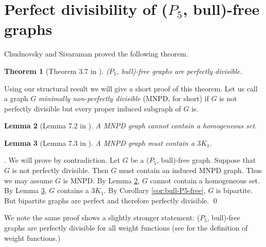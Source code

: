 \documentclass[a4paper,11pt]{article}
\newtheorem{theorem}{Theorem}[section]
\newtheorem{lemma}[theorem]{Lemma}
\theoremstyle{case}
\begin{document}
\section{Perfect divisibility of ($P_5$, bull)-free graphs}\label{sec:divisibility}
Chudnovsky and Sivaraman \cite{ChuSiv2019} proved the following theorem. 
\begin{theorem}[Theorem 3.7 in \cite{ChuSiv2019}]\label{thm:perfectlydivisible} 
($P_5$, bull)-free graphs are perfectly divisible. 
\end{theorem}
Using our structural result we will give a short proof of this theorem. Let us call a graph $G$ {\it minimally non-perfectly divisible} (MNPD, for short) if $G$ is not perfectly divisible but every proper induced subgraph of $G$ is. 
\begin{lemma}[Lemma 7.2 in \cite{Hoa2018}]\label{lem:homogeneous}
    A MNPD graph cannot contain a homogeneous set.
\end{lemma}
\begin{lemma}[Lemma 7.3 in \cite{Hoa2018}]\label{lem:3K1}
    A MNPD graph must contain a $3K_1$.
\end{lemma}
. We will prove by contradiction. 
Let $G$ be a ($P_5$, bull)-free graph. Suppose that $G$ is not perfectly divisible. Then $G$ must contain an induced MNPD graph. Thus we may assume $G$ is MNPD. By Lemma \ref{lem:homogeneous}, $G$ cannot contain a homogeneous set. By Lemma \ref{lem:3K1}, $G$ contains a $3K_1$. By Corollary \ref{cor:bull-P5-free}, $G$ is bipartite. But bipartite graphs are perfect and therefore perfectly divisible. \qed

We note the same proof shows a slightly stronger statement:  ($P_5$, bull)-free graphs are perfectly divisible for all weight functions (see \cite{Hoa2018} for the definition of weight functions.)
\end{document}
